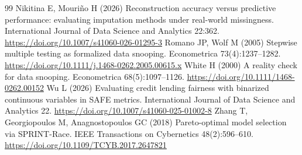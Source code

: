 \documentclass[11pt,a4paper]{article}
\begin{document}
\begin{thebibliography}{99}
 Nikitina E, Mouri{\~n}o H (2026) Reconstruction accuracy versus predictive performance: evaluating imputation methods under real-world missingness. International Journal of Data Science and Analytics 22:362. \url{https://doi.org/10.1007/s41060-026-01295-3}
 Romano JP, Wolf M (2005) Stepwise multiple testing as formalized data snooping. Econometrica 73(4):1237--1282. \url{https://doi.org/10.1111/j.1468-0262.2005.00615.x}
 White H (2000) A reality check for data snooping. Econometrica 68(5):1097--1126. \url{https://doi.org/10.1111/1468-0262.00152}
 Wu L (2026) Evaluating credit lending fairness with binarized continuous variables in SAFE metrics. International Journal of Data Science and Analytics 22. \url{https://doi.org/10.1007/s41060-025-01002-8}
 Zhang T, Georgiopoulos M, Anagnostopoulos GC (2018) Pareto-optimal model selection via SPRINT-Race. IEEE Transactions on Cybernetics 48(2):596--610. \url{https://doi.org/10.1109/TCYB.2017.2647821}
\end{thebibliography}
\end{document}
